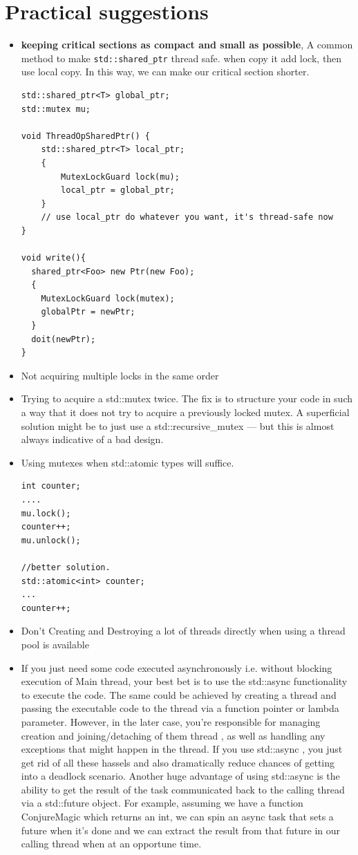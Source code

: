 \documentclass[a4paper,11pt,twoside]{book}
\begin{document}
\section{Practical suggestions}
\begin{itemize}
    \item \textbf{keeping critical sections as compact and small as possible},  A common method to make \texttt{std::shared\_ptr} thread safe. when copy it add lock, then use local copy. In this way, we can make our critical section shorter.
\begin{lstlisting}
std::shared_ptr<T> global_ptr;
std::mutex mu;

void ThreadOpSharedPtr() {
    std::shared_ptr<T> local_ptr;
    {
        MutexLockGuard lock(mu);
        local_ptr = global_ptr;
    }
    // use local_ptr do whatever you want, it's thread-safe now
}

void write(){
  shared_ptr<Foo> new Ptr(new Foo);
  {
    MutexLockGuard lock(mutex);
	globalPtr = newPtr;
  }
  doit(newPtr);
}
\end{lstlisting}
    \item Not acquiring multiple locks in the same order

    \item Trying to acquire a std::mutex twice. The fix is to structure your code in such a way that it does not try to acquire a previously locked mutex. A superficial solution might be to just use a std::recursive\_mutex — but this is almost always indicative of a bad design.

    \item Using mutexes when std::atomic types will suffice.
\begin{lstlisting}[]
int counter;
....
mu.lock();
counter++;
mu.unlock();

//better solution.
std::atomic<int> counter;
...
counter++;
\end{lstlisting}

    \item Don't Creating and Destroying a lot of threads directly when using a thread pool is available
    
    \item If you just need some code executed asynchronously i.e. without blocking execution of Main thread, your best bet is to use the std::async functionality to execute the code. The same could be achieved by creating a thread and passing the executable code to the thread via a function pointer or lambda parameter. However, in the later case, you're responsible for managing creation and joining/detaching of them thread , as well as handling any exceptions that might happen in the thread. If you use std::async , you just get rid of all these hassels and also dramatically reduce chances of getting into a deadlock scenario. Another huge advantage of using std::async is the ability to get the result of the task communicated back to the calling thread via a std::future object. For example, assuming we have a function ConjureMagic which returns an int, we can spin an async task that sets a future when it's done and we can extract the result from that future in our calling thread when at an opportune time.


\end{itemize}
\end{document}
